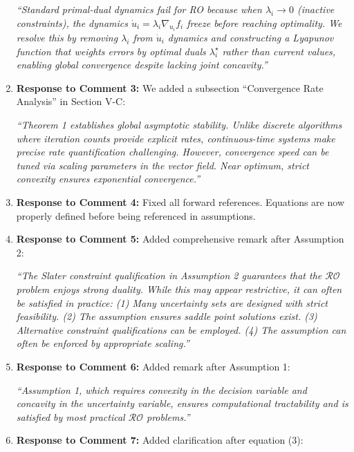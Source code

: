\documentclass[journal,twoside,web]{ieeecolor}
\begin{document}
\begin{enumerate}
{\color{revisionblue}\textit{``Standard primal-dual dynamics fail for RO because when $\lambda_i \to 0$ (inactive constraints), the dynamics $\dot{u}_i = \lambda_i \nabla_{u_i} f_i$ freeze before reaching optimality. We resolve this by removing $\lambda_i$ from $\dot{u}_i$ dynamics and constructing a Lyapunov function that weights errors by optimal duals $\lambda_i^\star$ rather than current values, enabling global convergence despite lacking joint concavity.''}}

\item \textbf{Response to Comment 3:} We added a subsection ``Convergence Rate Analysis'' in Section V-C:

{\color{revisionblue}\textit{``Theorem 1 establishes global asymptotic stability. Unlike discrete algorithms where iteration counts provide explicit rates, continuous-time systems make precise rate quantification challenging. However, convergence speed can be tuned via scaling parameters in the vector field. Near optimum, strict convexity ensures exponential convergence.''}}

\item \textbf{Response to Comment 4:} Fixed all forward references. Equations are now properly defined before being referenced in assumptions.

\item \textbf{Response to Comment 5:} Added comprehensive remark after Assumption 2:

{\color{revisionblue}\textit{``The Slater constraint qualification in Assumption 2 guarantees that the $\mathcal{RO}$ problem enjoys strong duality. While this may appear restrictive, it can often be satisfied in practice: (1) Many uncertainty sets are designed with strict feasibility. (2) The assumption ensures saddle point solutions exist. (3) Alternative constraint qualifications can be employed. (4) The assumption can often be enforced by appropriate scaling.''}}

\item \textbf{Response to Comment 6:} Added remark after Assumption 1:

{\color{revisionblue}\textit{``Assumption 1, which requires convexity in the decision variable and concavity in the uncertainty variable, ensures computational tractability and is satisfied by most practical $\mathcal{RO}$ problems.''}}

\item \textbf{Response to Comment 7:} Added clarification after equation (3):


\end{enumerate}
\end{document}
